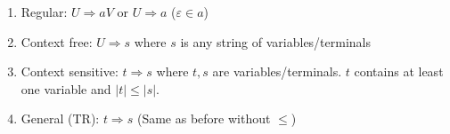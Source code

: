 \begin{enumerate}
    \item Regular: $U\Rightarrow aV$ or $U\Rightarrow a$ ($\varepsilon \in a$)
    \item Context free: $U\Rightarrow s$ where $s$ is any string of variables/terminals
    \item Context sensitive: $t\Rightarrow s$ where $t,s$ are variables/terminals. $t$ contains at least one variable and $|t| \leq |s|$.
    \item General (TR): $t\Rightarrow s$ (Same as before without $\leq$)
\end{enumerate}
